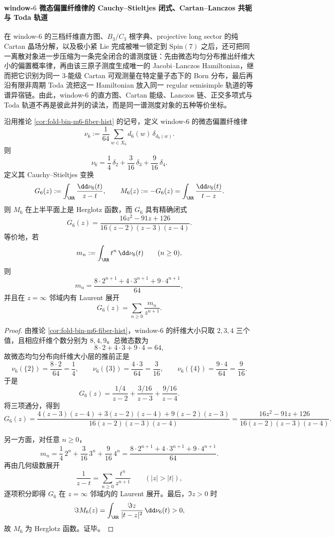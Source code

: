 \paragraph{window-\texorpdfstring{$6$}{6} 微态偏置纤维律的 Cauchy--Stieltjes 闭式、Cartan--Lanczos 共轭与 Toda 轨道}
在 window-\(6\) 的三档纤维直方图、\(B_3/C_3\) 根字典、projective long sector 的纯 Cartan 晶场分解，以及极小紧 Lie 完成被唯一锁定到 \(\mathrm{Spin}(7)\) 之后，还可把同一离散对象进一步压缩为一条完全闭合的谱测度链：先由微态均匀分布推出纤维大小的偏置概率律，再由该三原子测度生成唯一的 Jacobi--Lanczos Hamiltonian，继而把它识别为同一 \(3\)-能级 Cartan 可观测量在特定量子态下的 Born 分布，最后再沿有限非周期 Toda 流把这一 Hamiltonian 放入同一 regular semisimple 轨道的等谱异宿链。由此，window-\(6\) 的直方图、Cartan 能级、Lanczos 链、正交多项式与 Toda 轨道不再是彼此并列的读法，而是同一谱测度对象的五种等价坐标。

\begin{theorem}\label{thm:xi-time-part9zc-window6-microstate-biased-fiberlaw-herglotz-closedform}
沿用推论 \ref{cor:fold-bin-m6-fiber-hist} 的记号，定义 window-\(6\) 的微态偏置纤维律
\[
\nu_6
:=
\frac1{64}\sum_{w\in X_6}d_6(w)\,\delta_{d_6(w)}.
\]
则
\[
\nu_6=\frac14\,\delta_2+\frac3{16}\,\delta_3+\frac9{16}\,\delta_4.
\]
定义其 Cauchy--Stieltjes 变换
\[
G_6(z):=\int_{\RR}\frac{\dd\nu_6(t)}{z-t},
\qquad
M_6(z):=-G_6(z)=\int_{\RR}\frac{\dd\nu_6(t)}{t-z}.
\]
则 \(M_6\) 在上半平面上是 Herglotz 函数，而 \(G_6\) 具有精确闭式
\[
G_6(z)=\frac{16z^2-91z+126}{16(z-2)(z-3)(z-4)}.
\]
等价地，若
\[
m_n:=\int_{\RR} t^n\,\dd\nu_6(t)
\qquad (n\ge 0),
\]
则
\[
m_n=\frac{8\cdot 2^{n+1}+4\cdot 3^{n+1}+9\cdot 4^{n+1}}{64},
\]
并且在 \(z=\infty\) 邻域内有 Laurent 展开
\[
G_6(z)=\sum_{n\ge 0}\frac{m_n}{z^{n+1}}.
\]
\end{theorem}
\begin{proof}
由推论 \ref{cor:fold-bin-m6-fiber-hist}，window-\(6\) 的纤维大小只取 \(2,3,4\) 三个值，且相应纤维个数分别为 \(8,4,9\)。总微态数为
\[
8\cdot 2+4\cdot 3+9\cdot 4=64,
\]
故微态均匀分布向纤维大小层的推前正是
\[
\nu_6(\{2\})=\frac{8\cdot 2}{64}=\frac14,\qquad
\nu_6(\{3\})=\frac{4\cdot 3}{64}=\frac3{16},\qquad
\nu_6(\{4\})=\frac{9\cdot 4}{64}=\frac9{16}.
\]
于是
\[
G_6(z)=\frac{1/4}{z-2}+\frac{3/16}{z-3}+\frac{9/16}{z-4}.
\]
将三项通分，得到
\[
G_6(z)=\frac{4(z-3)(z-4)+3(z-2)(z-4)+9(z-2)(z-3)}{16(z-2)(z-3)(z-4)}
=\frac{16z^2-91z+126}{16(z-2)(z-3)(z-4)}.
\]

另一方面，对任意 \(n\ge 0\)，
\[
m_n=\frac14\,2^n+\frac3{16}\,3^n+\frac9{16}\,4^n
=\frac{8\cdot 2^{n+1}+4\cdot 3^{n+1}+9\cdot 4^{n+1}}{64}.
\]
再由几何级数展开
\[
\frac1{z-t}=\sum_{n\ge 0}\frac{t^n}{z^{n+1}}
\qquad (|z|>|t|),
\]
逐项积分即得 \(G_6\) 在 \(z=\infty\) 邻域内的 Laurent 展开。最后，\(\Im z>0\) 时
\[
\Im M_6(z)=\int_{\RR}\frac{\Im z}{|t-z|^2}\,\dd\nu_6(t)>0,
\]
故 \(M_6\) 为 Herglotz 函数。证毕。
\end{proof}


